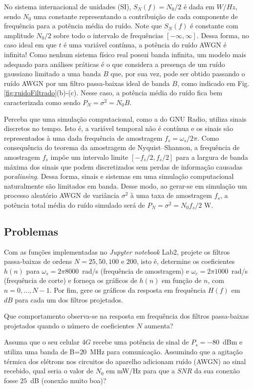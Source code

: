 \documentclass[12pt,addpoints]{exam}
\begin{document}
No sistema internacional de unidades (SI), $S_N(f)=N_0/2$ é dada em $W/Hz$, sendo $N_0$ uma constante representando a contribuição de cada componente de frequência para a potência média do ruído. Note que $S_N(f)$ é constante com amplitude $N_0/2$ sobre todo o intervalo de frequências $[-\infty,\infty]$. Dessa forma, no caso ideal em que $t$ é uma variável contínua, a potência do ruído AWGN é infinita! Como nenhum sistema físico real possui banda infinita, um modelo mais adequado para análises práticas é o que considera a presença de um ruído gaussiano limitado a uma banda $B$ que,  por sua vez, pode ser obtido passando o ruído AWGN  por um filtro passa-baixas ideal de banda $B$, como indicado em Fig.\ref{fig:ruidoFiltrado}(b)-(c). Nesse caso, a potência média do ruído fica bem caracterizada como sendo $P_N = \sigma^2 = N_0B$.

Perceba que uma simulação computacional, como a do GNU Radio, utiliza sinais discretos no tempo. Isto é, a variável temporal não é contínua e os sinais são representados à uma dada frequência de amostragem $f_s=\omega_s/2\pi$. Como consequência do teorema da amostragem de Nyquist–Shannon, a frequência de amostragem $f_s$ impõe um intervalo limite $[-f_s/2,f_s/2]$ para a largura de banda máxima dos sinais que podem discretizados sem perdas de informação causadas por\textit{aliasing}. Dessa forma, sinais e sistemas em uma simulação computacional naturalmente são limitados em banda. Desse modo, ao gerar-se em simulação um processo aleatório AWGN de variância $\sigma^2$ à uma taxa de amostragem $f_s$, a potência total média do ruído simulado será de $P_N = \sigma^2=N_0f_s/2$ W.

\subsection{Problemas}

\begin{questions}

\question Com as funções implementadas no \textit{Jupyter notebook} Lab2, projete os filtros passa-baixas de ordens $N = 25,50,100\text{ e }200$, isto é, determine os coeficientes $h(n)$ para $\omega_s = 2\pi 8000$~rad/s (frequência de amostragem) e $\omega_c = 2\pi 1000$~rad/s (frequência de corte) e forneça os gráficos de $h(n)$ em função de $n$, com $n=0,...,N-1$. Por fim, gere os gráficos da resposta em frequência $H(f)$ em $dB$ para cada um dos filtros projetados. 

\question Que comportamento observa-se na resposta em frequência dos filtros passa-baixas projetados quando o número de coeficientes $N$ aumenta?

\question Assuma que o seu celular $4G$ recebe uma potência de sinal de $P_s=-80$~dBm e utiliza uma banda de B=$20$~MHz para comunicação. Assumindo que a agitação térmica dos elétrons nos circuitos do aparelho adicionam ruído (AWGN) ao sinal recebido, qual seria o valor de $N_0$ em mW/Hz para que a $SNR$ da sua conexão fosse $25$~dB (conexão muito boa)?

\end{questions}
\end{document}
